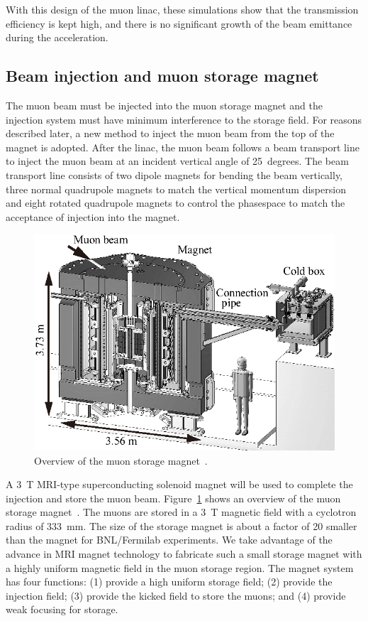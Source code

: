 With this design of the muon linac, these simulations show that the transmission efficiency is kept high,
and there is no significant growth of the beam emittance during the acceleration.

\subsection{Beam injection and muon storage magnet}

The muon beam must be injected into the muon storage magnet and the injection system
must have minimum interference to the storage field. For reasons described later,
a new method to inject the muon beam from the top of the magnet is adopted.
After the linac, the muon beam follows a beam transport line to inject the muon 
beam at an incident vertical angle of 25~degrees. The beam transport line consists of 
two dipole magnets for bending the beam vertically, three normal quadrupole magnets
to match the vertical momentum dispersion and eight rotated quadrupole magnets
to control the phasespace to match the acceptance of injection into the magnet.

\begin{figure}[t]
 \centerline{\includegraphics[width=12cm]{Fig/MagnetMechOverviewBW.eps}}
 \caption{Overview of the muon storage magnet~\cite{TDRsummarypaper}.}
\label{fig:magdesign}
\end{figure}

A $3$~T MRI-type superconducting solenoid magnet will be used to complete the injection and store the muon beam.
Figure~\ref{fig:magdesign} shows an overview of the muon storage magnet~\cite{sasaki:2016}.
The muons are stored in a 3~T magnetic field with a cyclotron radius of $333$~mm.
The size of the storage magnet is about a factor of 20 smaller than the magnet for BNL/Fermilab experiments.
We take advantage of the advance in MRI magnet technology to fabricate such a small storage magnet with a highly uniform magnetic field in the muon storage region.
The magnet system has four functions: (1) provide a high uniform storage field; 
(2) provide the injection field; (3) provide the kicked field to store the muons; 
and (4) provide weak focusing for storage.

